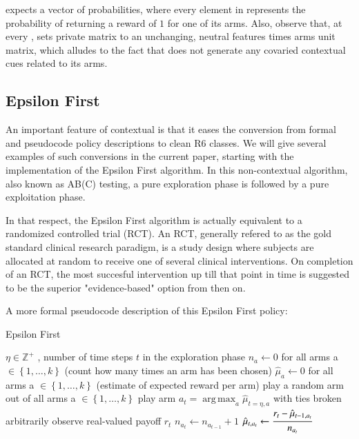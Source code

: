 \documentclass[nojss]{jss}\usepackage[]{graphicx}\usepackage[]{color}
\DeclareMathOperator*{\argmax}{arg\,max}
\begin{document}
 expects a  vector of probabilities, where every element in  represents the probability of  returning a reward of $1$ for one of its  arms. Also, observe that, at every ,  sets private  matrix  to an unchanging, neutral  features times  arms unit matrix, which alludes to the fact that  does not generate any covaried contextual cues related to its arms.

\subsection{Epsilon First}

An important feature of contextual is that it eases the conversion from formal and pseudocode policy descriptions to clean R6 classes. We will give several examples of such conversions in the current paper, starting with the implementation of the Epsilon First algorithm. In this non-contextual algorithm, also known as AB(C) testing, a pure exploration phase is followed by a pure exploitation phase.

In that respect, the Epsilon First algorithm is actually equivalent to a randomized controlled trial (RCT). An RCT, generally refered to as the gold standard clinical research paradigm, is a study design where subjects are allocated at random to receive one of several clinical interventions. On completion of an RCT, the most succesful intervention up till that point in time is suggested to be the superior "evidence-based" option from then on.

A more formal pseudocode description of this Epsilon First policy:

\begin{algorithm}[H]
\caption{Epsilon First}
\label{Alg:EpsilonFirst}
\begin{algorithmic}
\REQUIRE \(   \eta \in \mathbb{Z}^{+} \)  , number of time steps $t$ in the exploration phase
\STATE \( n_{a} \leftarrow 0 \) for all arms a \(  \in \left\{ 1, \dots, k \right\} \)  (count how many times an arm has been chosen)
\STATE \( \hat{\mu}_{a} \leftarrow 0 \) for all arms a  \(   \in \left\{ 1, \dots, k \right\} \)  (estimate of expected reward per arm)
	       \STATE play a random arm out of all arms a \(   \in \left\{ 1, \dots, k \right\} \)
	\ELSE
	        \STATE play arm \(a_t = \argmax_a  \hat{\mu}_{t=\eta,a}  \) with ties broken arbitrarily
	\ENDIF
	\STATE observe real-valued payoff $r_t$
	\STATE \( n_{a_{t}} \leftarrow n_{a_{t-1}} + 1  \)
   \STATE \( \hat{\mu}_{t,a_{t}} \leftarrow   \cfrac{r_t - \hat{\mu}_{t-1,a_{t}} }{n_{a_{t}}}   \)
\ENDFOR
\end{algorithmic}
\end{algorithm}
\end{document}
